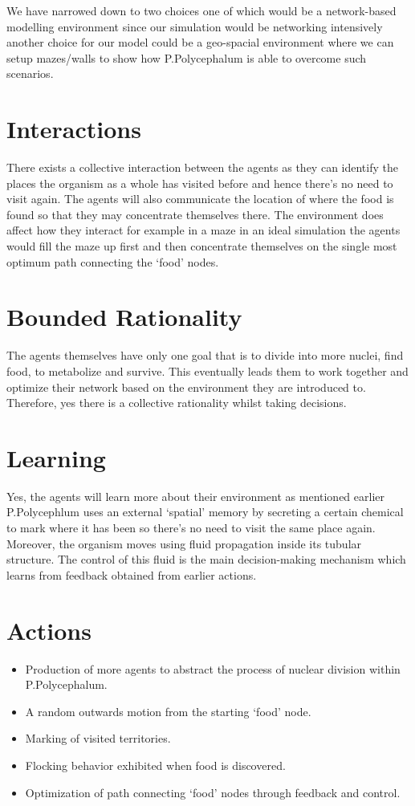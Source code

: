 \documentclass[11pt]{article}
\begin{document}
We have narrowed down to two choices one of which would be a network-based modelling environment since our simulation would be networking intensively another choice for our model could be a geo-spacial environment where we can setup mazes/walls to show how P.Polycephalum is able to overcome such scenarios.

\section{Interactions}
There exists a collective interaction between the agents as they can identify the places the organism as a whole has visited before and hence there’s no need to visit again. The agents will also communicate the location of where the food is found so that they may concentrate themselves there. The environment does affect how they interact for example in a maze in an ideal simulation the agents would fill the maze up first and then concentrate themselves on the single most optimum path connecting the ‘food’ nodes.

\section{Bounded Rationality}
The agents themselves have only one goal that is to divide into more nuclei, find food, to metabolize and survive. This eventually leads them to work together and optimize their network based on the environment they are introduced to. Therefore, yes there is a collective rationality whilst taking decisions.
\section{Learning}
Yes, the agents will learn more about their environment as mentioned earlier P.Polycephlum uses an external ‘spatial’ memory by secreting a certain chemical to mark where it has been so there’s no need to visit the same place again. Moreover, the organism moves using fluid propagation inside its tubular structure. The control of this fluid is the main decision-making mechanism which learns from feedback obtained from earlier actions.
\section{Actions}
\begin{itemize}
    \item Production of more agents to abstract the process of nuclear division within P.Polycephalum.

    \item A random outwards motion from the starting ‘food’ node.
    
    \item Marking of visited territories.
    
    \item Flocking behavior exhibited when food is discovered.
    
    \item Optimization of path connecting ‘food’ nodes through feedback and control.
\end{itemize}
\end{document}
